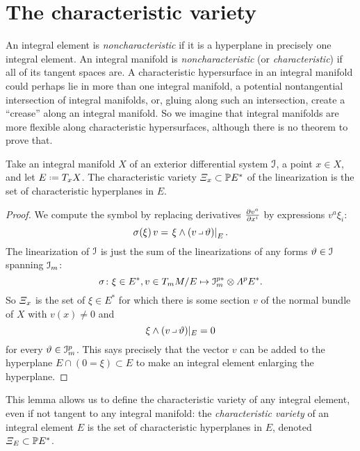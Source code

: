 \section{The characteristic variety}
An integral element is \emph{noncharacteristic} if it is a hyperplane in precisely one integral element.
An integral manifold is \emph{noncharacteristic} (or \emph{characteristic}) if all of its tangent spaces are.
A characteristic hypersurface in an integral manifold could perhaps lie in more than one integral manifold, a potential nontangential intersection of integral manifolds, or, gluing along such an intersection, create a ``crease'' along an integral manifold.
So we imagine that integral manifolds are more flexible along characteristic hypersurfaces, although there is no theorem to prove that.
\begin{lemma}\label{lemma:char.var}
Take an integral manifold \(X\) of an exterior differential system \(\mathcal{I}\), a point \(x \in X\), and let \(E\defeq T_x X\).
The characteristic variety 
\(
\CV_x \subset \Proj(E^*)
\)
of the linearization is the set of characteristic hyperplanes in \(E\).
\end{lemma}
\begin{proof}
We compute the symbol by replacing derivatives \(\pderiv{v^a}{x^i}\) by expressions \(v^a\xi_i\):
\[
\opsymbol[]{\xi}v = \left.\xi \wedge (v \hook \vartheta)\right|_E.
\]
The linearization of \(\mathcal{I}\) is just the sum of the linearizations of any forms \(\vartheta \in \mathcal{I}\) spanning \(\mathcal{I}_m\):
\[
\opsymbol{} \colon \xi \in E^*, v \in T_m M/E \mapsto \II_m^{p*} \otimes \Lm{p}{E}^*.
\]
So \(\CV_x\) is the set of \(\xi \in E^*\) for which there is some section \(v\) of the normal bundle of \(X\) with \(v(x)\ne 0\) and 
\[
\xi \wedge (v \hook \vartheta)|_E=0
\]
for every \(\vartheta \in \mathcal{I}^p_m\).
This says precisely that the vector \(v\) can be added to the hyperplane \(E\cap (0=\xi) \subset E\) to make an integral element enlarging the hyperplane.
\end{proof}
This lemma allows us to define the characteristic variety of any integral element, even if not tangent to any integral manifold: the \emph{characteristic variety} of an integral element \(E\) is the set of characteristic hyperplanes in \(E\), denoted \(\CV_E\subset \Proj(E^*)\).
